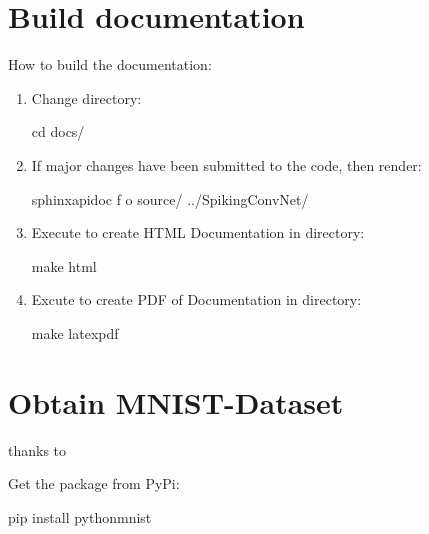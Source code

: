 \documentclass[letterpaper,10pt,english]{sphinxmanual}
\begin{document}
\section{Build documentation}
\label{\detokenize{misc:build-documentation}}
How to build the documentation:
\begin{enumerate}
\item {} 
Change directory:

\begin{sphinxVerbatim}[commandchars=\\\{\}]
\PYGZdl{} cd docs/
\end{sphinxVerbatim}

\item {} 
If major changes have been submitted to the code, then render:

\begin{sphinxVerbatim}[commandchars=\\\{\}]
\PYGZdl{} sphinx\PYGZhy{}apidoc \PYGZhy{}f \PYGZhy{}o source/ ../SpikingConvNet/
\end{sphinxVerbatim}

\item {} 
Execute to create HTML Documentation in  directory:

\begin{sphinxVerbatim}[commandchars=\\\{\}]
\PYGZdl{} make html
\end{sphinxVerbatim}

\item {} 
Excute to create PDF of Documentation in  directory:

\begin{sphinxVerbatim}[commandchars=\\\{\}]
\PYGZdl{} make latexpdf
\end{sphinxVerbatim}

\end{enumerate}


\section{Obtain MNIST-Dataset}
\label{\detokenize{misc:obtain-mnist-dataset}}
thanks to 

Get the package from PyPi:

\begin{sphinxVerbatim}[commandchars=\\\{\}]
\PYGZdl{} pip install python\PYGZhy{}mnist
\end{sphinxVerbatim}
\end{document}
